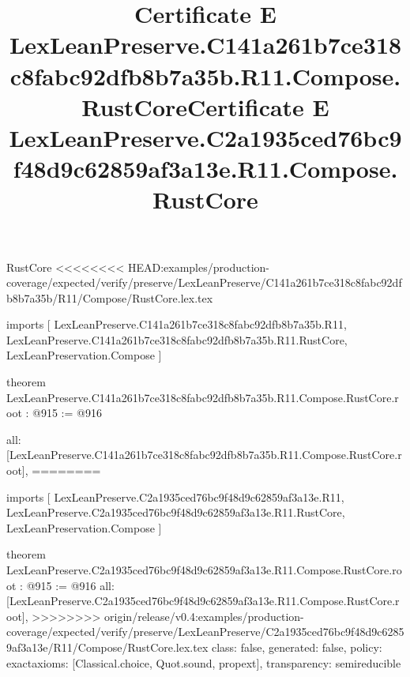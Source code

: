 \begin{lexlean}{RustCore}
<<<<<<<< HEAD:examples/production-coverage/expected/verify/preserve/LexLeanPreserve/C141a261b7ce318c8fabc92dfb8b7a35b/R11/Compose/RustCore.lex.tex
\title{Certificate E LexLeanPreserve.C141a261b7ce318c8fabc92dfb8b7a35b.R11.Compose.RustCore}
\begin{coremodule}
imports [
  LexLeanPreserve.C141a261b7ce318c8fabc92dfb8b7a35b.R11,
  LexLeanPreserve.C141a261b7ce318c8fabc92dfb8b7a35b.R11.RustCore,
  LexLeanPreservation.Compose
]

theorem LexLeanPreserve.C141a261b7ce318c8fabc92dfb8b7a35b.R11.Compose.RustCore.root : @915 := @916 {
  all: [LexLeanPreserve.C141a261b7ce318c8fabc92dfb8b7a35b.R11.Compose.RustCore.root],
========
\title{Certificate E LexLeanPreserve.C2a1935ced76bc9f48d9c62859af3a13e.R11.Compose.RustCore}
\begin{coremodule}
imports [
  LexLeanPreserve.C2a1935ced76bc9f48d9c62859af3a13e.R11,
  LexLeanPreserve.C2a1935ced76bc9f48d9c62859af3a13e.R11.RustCore,
  LexLeanPreservation.Compose
]

theorem LexLeanPreserve.C2a1935ced76bc9f48d9c62859af3a13e.R11.Compose.RustCore.root : @915 := @916 {
  all: [LexLeanPreserve.C2a1935ced76bc9f48d9c62859af3a13e.R11.Compose.RustCore.root],
>>>>>>>> origin/release/v0.4:examples/production-coverage/expected/verify/preserve/LexLeanPreserve/C2a1935ced76bc9f48d9c62859af3a13e/R11/Compose/RustCore.lex.tex
  class: false,
  generated: false,
  policy: exact{axioms: [Classical.choice, Quot.sound, propext]},
  transparency: semireducible
}


\end{coremodule}}
\end{coremodule}
\end{lexlean}

